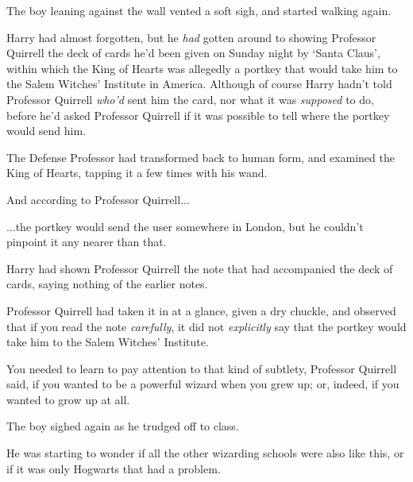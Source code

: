 The boy leaning against the wall vented a soft sigh, and started walking again.

Harry had almost forgotten, but he \emph{had} gotten around to showing Professor Quirrell the deck of cards he’d been given on Sunday night by ‘Santa Claus’, within which the King of Hearts was allegedly a portkey that would take him to the Salem Witches’ Institute in America. Although of course Harry hadn’t told Professor Quirrell \emph{who’d} sent him the card, nor what it was \emph{supposed} to do, before he’d asked Professor Quirrell if it was possible to tell where the portkey would send him.

The Defense Professor had transformed back to human form, and examined the King of Hearts, tapping it a few times with his wand.

And according to Professor Quirrell...

...the portkey would send the user somewhere in London, but he couldn’t pinpoint it any nearer than that.

Harry had shown Professor Quirrell the note that had accompanied the deck of cards, saying nothing of the earlier notes.

Professor Quirrell had taken it in at a glance, given a dry chuckle, and observed that if you read the note \emph{carefully}, it did not \emph{explicitly} say that the portkey would take him to the Salem Witches’ Institute.

You needed to learn to pay attention to that kind of subtlety, Professor Quirrell said, if you wanted to be a powerful wizard when you grew up; or, indeed, if you wanted to grow up at all.

The boy sighed again as he trudged off to class.

He was starting to wonder if all the other wizarding schools were also like this, or if it was only Hogwarts that had a problem.


